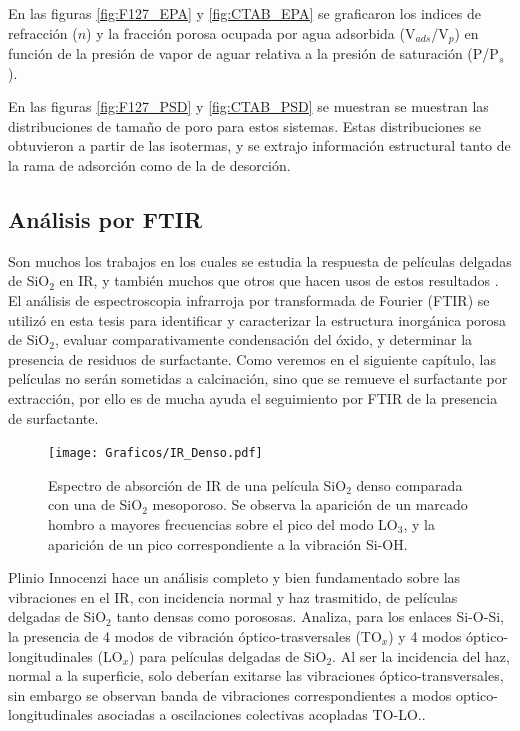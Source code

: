 		En las figuras \ref{fig:F127_EPA} y \ref{fig:CTAB_EPA} se graficaron los indices de refracción ($n$) y la fracción porosa ocupada por agua adsorbida (V$_{ads}$/V$_p$) en función de la presión de vapor de aguar relativa a la presión de saturación (P/P$_s$). 

		En las figuras \ref{fig:F127_PSD} y \ref{fig:CTAB_PSD} se muestran se muestran las distribuciones de tamaño de poro para estos sistemas. Estas distribuciones se obtuvieron a partir de las isotermas, y se extrajo información estructural tanto de la rama de adsorción como de la de desorción.

	\subsection{Análisis por FTIR}\label{sec:Analisis_IR}

		Son muchos los trabajos en los cuales se estudia la respuesta de películas delgadas de SiO$_2$ en IR\cite{Olsen1989,Almeida1990,Redol1997,Innocenzi2003}, y también muchos que otros que hacen usos de estos resultados \cite{Angelome2008,Calvo2008,Calvo20210}.
		El análisis de espectroscopia infrarroja por transformada de Fourier (FTIR) se utilizó en esta tesis para identificar y caracterizar la estructura inorgánica porosa de SiO$_2$, evaluar comparativamente condensación del óxido, y determinar la presencia de residuos de surfactante. Como veremos en el siguiente capítulo, las películas no serán sometidas a calcinación, sino que se remueve el surfactante por extracción, por ello es de mucha ayuda el seguimiento por FTIR de la presencia de surfactante. 

			\begin{figure}[!ht]
						\begin{center}
						\texttt{[image: Graficos/IR\_Denso.pdf]}
						\caption[FTIR SiO$_2$ denso y SiO$_2$ mesoporoso.]{Espectro de absorción de IR de una película SiO$_2$ denso comparada con una de SiO$_2$ mesoporoso. Se observa la aparición de un marcado hombro a mayores frecuencias sobre el pico del modo LO$_3$, y la aparición de un pico correspondiente a la vibración Si-OH.}
						\label{fig:IR-denso}
						\end{center}
						\end{figure}

		Plinio Innocenzi\cite{Innocenzi2003} hace un análisis completo y bien fundamentado sobre las vibraciones en el IR, con incidencia normal y haz trasmitido, de películas delgadas de SiO$_2$ tanto densas como porososas. Analiza, para los enlaces Si-O-Si, la presencia de 4 modos de vibración óptico-trasversales (TO$_x$) y 4 modos óptico-longitudinales (LO$_x$) para películas delgadas de SiO$_2$. Al ser la incidencia del haz, normal a la superficie, solo deberían exitarse las vibraciones óptico-transversales, sin embargo se observan banda de vibraciones correspondientes a modos optico-longitudinales asociadas a oscilaciones colectivas acopladas TO-LO.\cite{Pai1986,Grosse1986,Innocenzi2003}.

